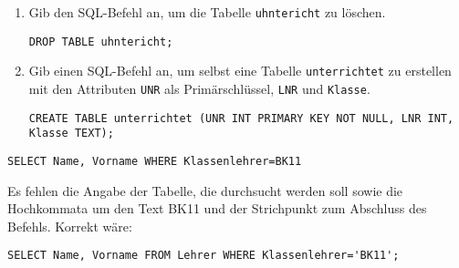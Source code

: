 \documentclass[a4paper,12pt, headsepline, ngerman]{scrartcl}
\begin{document}
	\begin{Answer}[ref=KA_SQL_A3]
		\begin{enumerate}[label=\alph*)]
			\item Gib den SQL-Befehl an, um die Tabelle \lstinline!uhntericht! zu löschen.

			\lstinline!DROP TABLE uhntericht;!
			\item Gib einen SQL-Befehl an, um selbst eine Tabelle \lstinline!unterrichtet! zu erstellen mit den Attributen \lstinline!UNR! als Primärschlüssel, \lstinline!LNR! und \lstinline!Klasse!.

			\lstinline!CREATE TABLE unterrichtet (UNR INT PRIMARY KEY NOT NULL, LNR INT, Klasse TEXT);!
		\end{enumerate}
	\end{Answer}%
	\begin{Answer}[ref=KA_SQL_A4]

		\lstinline!SELECT Name, Vorname WHERE Klassenlehrer=BK11!

		Es fehlen die Angabe der Tabelle, die durchsucht werden soll sowie die Hochkommata um den Text BK11 und der Strichpunkt zum Abschluss des Befehls. Korrekt wäre:

		\lstinline!SELECT Name, Vorname FROM Lehrer WHERE Klassenlehrer='BK11';!
	\end{Answer}%
\end{document}
